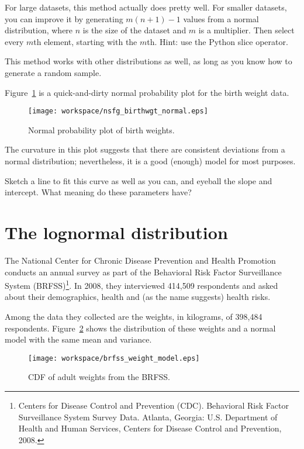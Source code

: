 \documentclass[10pt]{book}
\begin{document}
For large datasets, this method actually does pretty well.
For smaller datasets, you can improve it by generating $m (n+1) - 1$
values from a normal distribution, where $n$ is the size of the
dataset and $m$ is a multiplier.  Then select every $m$th element,
starting with the $m$th.  Hint: use the Python slice operator.

This method works with other distributions as well, as long as
you know how to generate a random sample.

Figure~\ref{nsfg_birthwgt_normal} is a quick-and-dirty normal
probability plot for the birth weight data.

\begin{figure}
\centerline{\texttt{[image: workspace/nsfg\_birthwgt\_normal.eps]}}
\caption{Normal probability plot of birth weights.}
\label{nsfg_birthwgt_normal}
\end{figure}

The curvature in this plot suggests that there are consistent
deviations from a normal distribution; nevertheless, it is a
good (enough) model for most purposes.

\begin{ex}
Sketch a line to fit this curve as well as you can, and
eyeball the slope and intercept.  What meaning do these parameters have?
\end{ex}


\section{The lognormal distribution}

The National Center for Chronic Disease Prevention and Health
Promotion conducts an annual survey as part of the Behavioral Risk
Factor Surveillance System (BRFSS)\footnote{Centers for Disease
  Control and Prevention (CDC). Behavioral Risk Factor Surveillance
  System Survey Data. Atlanta, Georgia: U.S. Department of Health and
  Human Services, Centers for Disease Control and Prevention, 2008.}.
In 2008, they interviewed 414,509 respondents and asked about their
demographics, health and (as the name suggests) health risks.

Among the data they collected are the weights, in kilograms, of
398,484 respondents.  Figure~\ref{brfss_weight_model} shows the
distribution of these weights and a normal model with the same mean
and variance.

\begin{figure}
\centerline{\texttt{[image: workspace/brfss\_weight\_model.eps]}}
\caption{CDF of adult weights from the BRFSS.}
\label{brfss_weight_model}
\end{figure}
\end{document}
